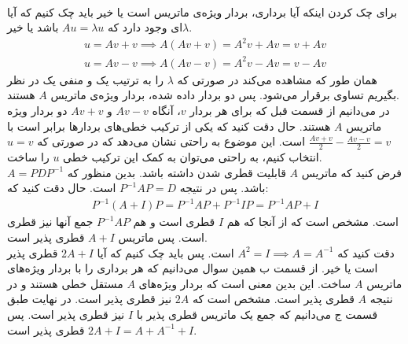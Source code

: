\\
برای چک کردن اینکه آیا برداری، بردار ویژه‌ی ماتریس است یا خیر باید چک کنیم که آیا
$\lambda$ای
وجود دارد که
$Au = \lambda u$
باشد یا خیر.
\begin{gather*}
    u = Av + v \implies A(Av + v) = A^2v + Av = v + Av\\
    u = Av - v \implies A(Av - v) = A^2v - Av = v - Av
\end{gather*}
همان طور که مشاهده می‌کند در صورتی که
$\lambda$
را به ترتیب یک و منفی یک در نظر بگیریم تساوی برقرار می‌شود. پس دو بردار داده شده، بردار ویژه‌ی ماتریس
$A$
هستند.
\\
در می‌دانیم از قسمت قبل که برای هر بردار
$v$، آنگاه
$Av - v$ و $Av + v$
دو بردار ویژه ماتریس
$A$
هستند. حال دقت کنید که یکی از ترکیب خطی‌های بردار‌ها برابر است با
$\frac{Av+v}{2}-\frac{Av-v}{2}=v$
است. این موضوع به راحتی نشان می‌دهد که در صورتی که
$u=v$ انتخاب کنیم،
به راحتی می‌توان به کمک این ترکیب خطی
$u$ را ساخت.
\\
فرض کنید که ماتریس
$A$
قابلیت قطری شدن داشته باشد. بدین منظور که
$A = PDP^{-1}$
باشد. پس در نتیجه
$P^{-1}AP = D$
است. حال دقت کنید که:
\begin{gather*}
    P^{-1}(A+I)P = P^{-1}AP + P^{-1}IP = P^{-1}AP + I
\end{gather*}
است. مشخص است که از آنجا که هم
$I$
قطری است و هم
$P^{-1}AP$
جمع آنها نیز قطری است. پس ماتریس
$A+I$
قطری پذیر است.
\\
دقت کنید که
$A^2 = I \implies A = A^{-1}$
است. پس باید چک کنیم که آیا
$2A + I$
قطری پذیر است یا خیر.
از قسمت ب همین سوال می‌دانیم که هر برداری را با بردار ویژه‌های ماتریس
$A$
ساخت. این بدین معنی است که بردار ویژه‌های
$A$
مستقل خطی هستند و در نتیجه
$A$
قطری پذیر است. مشخص است که
$2A$
نیز قطری پذیر است. در نهایت طبق قسمت ج می‌دانیم که جمع یک ماتریس قطری پذیر با
$I$
نیز قطری پذیر است. پس
$2A + I = A + A^{-1} + I$
قطری پذیر است.




